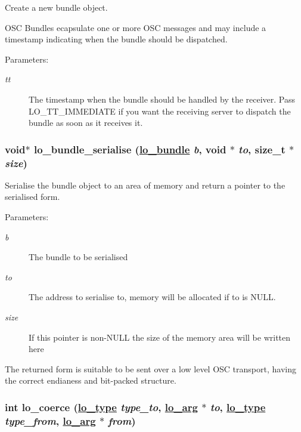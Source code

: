 Create a new bundle object. 

OSC Bundles ecapsulate one or more OSC messages and may include a timestamp indicating when the bundle should be dispatched.

\begin{Desc}
\item[Parameters:]
\begin{description}
\item[{\em tt}]The timestamp when the bundle should be handled by the receiver. Pass LO\_\-TT\_\-IMMEDIATE if you want the receiving server to dispatch the bundle as soon as it receives it. \end{description}
\end{Desc}
\hypertarget{group__liblolowlevel_gea61bc73c281efe4e2f95456e4d0f9f5}{
\subsubsection[lo\_\-bundle\_\-serialise]{\setlength{\rightskip}{0pt plus 5cm}void$\ast$ lo\_\-bundle\_\-serialise (\hyperlink{lo__types_8h_96254950ad34e9cfbf8a6613fc74025b}{lo\_\-bundle} {\em b}, void $\ast$ {\em to}, size\_\-t $\ast$ {\em size})}}
\label{group__liblolowlevel_gea61bc73c281efe4e2f95456e4d0f9f5}


Serialise the bundle object to an area of memory and return a pointer to the serialised form. 

\begin{Desc}
\item[Parameters:]
\begin{description}
\item[{\em b}]The bundle to be serialised \item[{\em to}]The address to serialise to, memory will be allocated if to is NULL. \item[{\em size}]If this pointer is non-NULL the size of the memory area will be written here\end{description}
\end{Desc}
The returned form is suitable to be sent over a low level OSC transport, having the correct endianess and bit-packed structure. \hypertarget{group__liblolowlevel_gf85d7a54ab80e1b2a3d17c4cfef38402}{
\subsubsection[lo\_\-coerce]{\setlength{\rightskip}{0pt plus 5cm}int lo\_\-coerce (\hyperlink{group__liblo_g11838c576b0197c255ce805fd7434736}{lo\_\-type} {\em type\_\-to}, \hyperlink{unionlo__arg}{lo\_\-arg} $\ast$ {\em to}, \hyperlink{group__liblo_g11838c576b0197c255ce805fd7434736}{lo\_\-type} {\em type\_\-from}, \hyperlink{unionlo__arg}{lo\_\-arg} $\ast$ {\em from})}}
\label{group__liblolowlevel_gf85d7a54ab80e1b2a3d17c4cfef38402}


